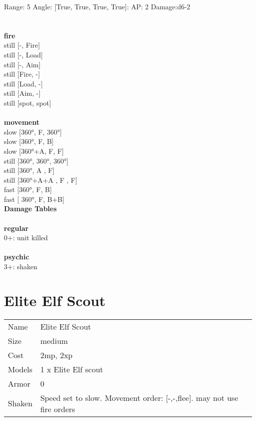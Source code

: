 Range: 5  Angle: [True, True, True, True]: AP: 2 Damage:d6-2 \\




 
\ \\



\ \\ {\bf fire } \\
still [-, Fire] \\
still [-, Load] \\
still [-, Aim] \\
still [Fire, -] \\
still [Load, -] \\
still [Aim, -] \\
still [spot, spot] \\
\ \\ {\bf movement } \\
slow [360°, F, 360°] \\
slow [360°, F, B] \\
slow [360°+A, F, F] \\
still [360°, 360°, 360°] \\
still [360°, A , F] \\
still [360°+A+A , F , F] \\
fast [360°, F, B] \\
fast [ 360°,  F, B+B] \\


{\bf Damage Tables} \\
\ \\ {\bf regular } \\
0+: unit killed \\
\ \\ {\bf psychic } \\
3+: shaken \\










\pagebreak\pagebreak

\section{ Elite Elf Scout }

\begin{tabular}{ll}
  Name & Elite Elf Scout \\
  Size & medium\\
  Cost & 2mp, 2xp\\
  Models & 1 x Elite Elf scout\\
  Armor & 0\\
  Shaken & Speed set to slow. Movement order: [-,-,flee]. may not use fire orders\\
\end{tabular}

